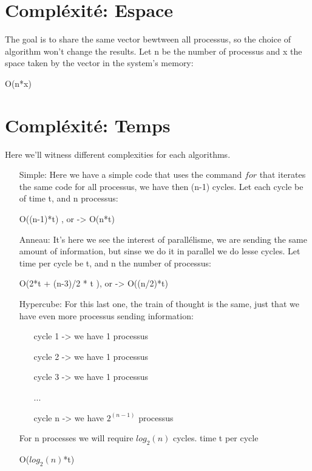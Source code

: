 \documentclass[a4paper]{article}
\begin{document}
\section*{Compléxité: Espace}
The goal is to share the same vector bewtween all processus, so the choice of algorithm won't change the results.
Let n be the number of processus and x the space taken by the vector in the system's memory:
\begin{center}
O(n*x) 
\end{center}

\section*{Compléxité: Temps}
Here we'll witness different complexities for each algorithms.
\begin{itemize}
\item[Simple:] Here we have a simple code that uses the command $for$ that iterates the same code for all processus, we have then (n-1) cycles. Let each cycle be of time t, and n processus:  
\begin{center}
O((n-1)*t) , or ->  O(n*t)
\end{center}


\item[Anneau:] It's here we see the interest of parallélisme, we are sending the same amount of information, but sinse we do it in parallel we do lesse cycles. Let time per cycle be t, and n the number of processus:  
\begin{center}
O(2*t + (n-3)/2 * t ), or ->  O((n/2)*t) 
\end{center}

\item[Hypercube:] For this last one, the train of thought is the same, just that we have even more processus sending information:

\begin{itemize} 
\item[cycle 1 -> ] we have 1 processus
\item[cycle 2 -> ] we have 1 processus
\item[cycle 3 -> ] we have 1 processus
\item[ ... ]
\item[cycle n -> ] we have $2^{(n-1)}$ processus
\end{itemize} 

For n processes we will require $log_{2}(n)$ cycles. time t per cycle
\begin{center}
O($log_{2}(n)$*t) 
\end{center}
\end{itemize}
\end{document}
